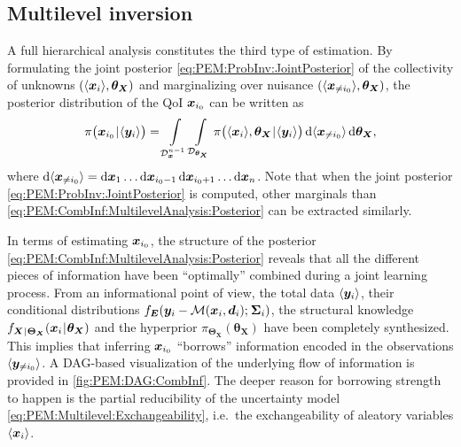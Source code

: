 \subsection{Multilevel inversion} \label{sec:PEM:CombInf:MultilevelAnalysis}
A full hierarchical analysis constitutes the third type of estimation.
By formulating the joint posterior \cref{eq:PEM:ProbInv:JointPosterior} of the collectivity of unknowns \((\langle{\bm{x}_i}\rangle,\bm{\theta}_{\bm{X}})\)
and marginalizing over nuisance \((\langle{\bm{x}_{\neq i_0}}\rangle,\bm{\theta}_{\bm{X}})\), the posterior distribution of the QoI \(\bm{x}_{i_0}\) can be written as
\begin{equation} \label{eq:PEM:CombInf:MultilevelAnalysis:Posterior}
  \pi \big( \bm{x}_{i_0} {\:\!}|{\:\!} \langle{\bm{y}_i}\rangle \big) = \int\limits_{\mathcal{D}_{\bm{x}}^{n-1}} \int\limits_{\mathcal{D}_{\bm{\theta}_{\bm{X}}}}
  \pi \big( \langle{\bm{x}_i}\rangle,\bm{\theta}_{\bm{X}} {\:\!}|{\:\!} \langle{\bm{y}_i}\rangle \big) \, \mathrm{d} \langle{\bm{x}_{\neq i_0}}\rangle \, \mathrm{d} \bm{\theta}_{\bm{X}},
\end{equation}
where \(\mathrm{d} \langle{\bm{x}_{\neq i_0}}\rangle = \mathrm{d}\bm{x}_1 \ldots \mathrm{d}\bm{x}_{i_0-1} \, \mathrm{d}\bm{x}_{i_0+1} \ldots \mathrm{d}\bm{x}_n\).
Note that when the joint posterior \cref{eq:PEM:ProbInv:JointPosterior} is computed, other marginals than \cref{eq:PEM:CombInf:MultilevelAnalysis:Posterior} can be extracted similarly.
\par %
In terms of estimating \(\bm{x}_{i_0}\), the structure of the posterior \cref{eq:PEM:CombInf:MultilevelAnalysis:Posterior} reveals that
all the different pieces of information have been ``optimally'' combined during a joint learning process.
From an informational point of view, the total data \(\langle{\bm{y}_i}\rangle\), their conditional distributions \(f_{\bm{E}} (\bm{y}_i-\mathcal{M}(\bm{x}_i,\bm{d}_i) ;{\:\!} \bm{\Sigma}_i)\),
the structural knowledge \(f_{\bm{X} {\:\!}|{\:\!} \bm{\Theta}_{\bm{X}}} (\bm{x}_i {\:\!}|{\:\!} \bm{\theta}_{\bm{X}})\) and the hyperprior \(\pi_{\bm{\Theta}_{\bm{X}}} (\bm{\theta}_{\bm{X}})\) have been completely synthesized.
This implies that inferring \(\bm{x}_{i_0}\) ``borrows'' information encoded in the observations \(\langle{\bm{y}_{\neq i_0}}\rangle\).
A DAG-based visualization of the underlying flow of information is provided in \cref{fig:PEM:DAG:CombInf}.
The deeper reason for borrowing strength to happen is the partial reducibility of the uncertainty model \cref{eq:PEM:Multilevel:Exchangeability}, i.e.\ the exchangeability of aleatory variables \(\langle{\bm{x}_i}\rangle\).
